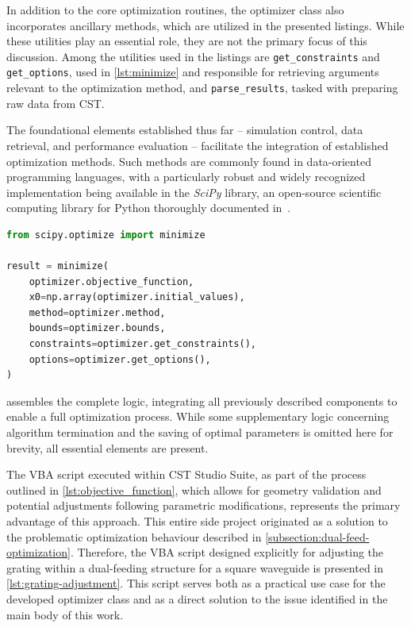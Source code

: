 \documentclass[11pt,a4paper,twoside,openany]{report}
\begin{document}
In addition to the core optimization routines, the optimizer class also incorporates ancillary methods, which are utilized in the presented listings. While these utilities play an essential role, they are not the primary focus of this discussion.  Among the utilities used in the listings are \texttt{get\_constraints} and \texttt{get\_options}, used in \cref{lst:minimize} and responsible for retrieving arguments relevant to the optimization method, and \texttt{parse\_results}, tasked with preparing raw data from CST.

The foundational elements established thus far -- simulation control, data retrieval, and performance evaluation -- facilitate the integration of established optimization methods. Such methods are commonly found in data-oriented programming languages, with a particularly robust and widely recognized implementation being available in the \emph{SciPy} library, an open-source scientific computing library for Python thoroughly documented in~\parencite{virtanen-et-al:scipy}.

\begin{lstlisting}[caption={Use of CSTOptimizer with SciPy}, label={lst:minimize}, language=Python]
from scipy.optimize import minimize

result = minimize(
    optimizer.objective_function,
    x0=np.array(optimizer.initial_values),
    method=optimizer.method,
    bounds=optimizer.bounds,
    constraints=optimizer.get_constraints(),
    options=optimizer.get_options(),
)
\end{lstlisting}

 assembles the complete logic, integrating all previously described components to enable a full optimization process. While some supplementary logic concerning algorithm termination and the saving of optimal parameters is omitted here for brevity, all essential elements are present.

The VBA script executed within CST Studio Suite, as part of the process outlined in \cref{lst:objective_function}, which allows for geometry validation and potential adjustments following parametric modifications, represents the primary advantage of this approach. This entire side project originated as a solution to the problematic optimization behaviour described in \cref{subsection:dual-feed-optimization}. Therefore, the VBA script designed explicitly for adjusting the grating within a dual-feeding structure for a square waveguide is presented in \cref{lst:grating-adjustment}. This script serves both as a practical use case for the developed optimizer class and as a direct solution to the issue identified in the main body of this work.
\end{document}
